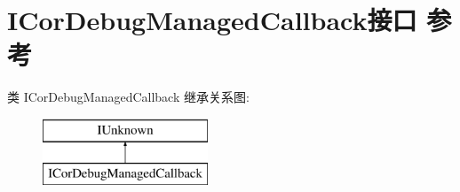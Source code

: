 \hypertarget{interface_i_cor_debug_managed_callback}{}\section{I\+Cor\+Debug\+Managed\+Callback接口 参考}
\label{interface_i_cor_debug_managed_callback}
类 I\+Cor\+Debug\+Managed\+Callback 继承关系图\+:\begin{figure}[H]
\begin{center}
\leavevmode
\includegraphics[height=2.000000cm]{interface_i_cor_debug_managed_callback}
\end{center}
\end{figure}
